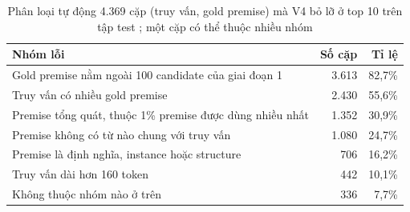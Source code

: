 \begin{table}[htbp]
\centering
\caption[Phân loại tự động các lỗi của V4]{Phân loại tự động 4.369 cặp (truy vấn, gold premise) mà V4 bỏ lỡ ở top 10 trên tập test ; một cặp có thể thuộc nhiều nhóm}\label{tab:errors}
\begin{tabularx}{\linewidth}{@{}Xrr@{}}
\toprule
Nhóm lỗi & Số cặp & Tỉ lệ \\
\midrule
Gold premise nằm ngoài 100 candidate của giai đoạn 1 & 3.613 & 82,7\% \\
Truy vấn có nhiều gold premise & 2.430 & 55,6\% \\
Premise tổng quát, thuộc 1\% premise được dùng nhiều nhất & 1.352 & 30,9\% \\
Premise không có từ nào chung với truy vấn & 1.080 & 24,7\% \\
Premise là định nghĩa, instance hoặc structure & 706 & 16,2\% \\
Truy vấn dài hơn 160 token & 442 & 10,1\% \\
Không thuộc nhóm nào ở trên & 336 & 7,7\% \\
\bottomrule
\end{tabularx}
\end{table}
